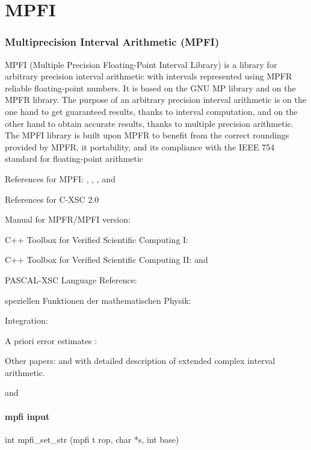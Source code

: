 \chapter{MPFI}



\subsection{Multiprecision Interval Arithmetic (MPFI)}
MPFI (Multiple Precision Floating-Point Interval Library) is a library for arbitrary precision interval arithmetic with intervals represented using MPFR reliable floating-point numbers. It is based on the GNU MP library and on the MPFR library. The purpose of an arbitrary precision interval arithmetic is on the one hand to get guaranteed results, thanks to interval computation, and on the other hand to obtain accurate results, thanks to multiple precision arithmetic. The MPFI library is built upon MPFR to benefit from the correct roundings provided by MPFR, it portability, and its compliance with the IEEE 754 standard for floating-point arithmetic

References for MPFI: \cite{MPFI_2005}, \cite{Moore_2009},  \cite{Hayer2003},  and \cite{INTLAB_1999}

References for C-XSC 2.0  \cite{Hofschuster2004}

Manual for MPFR/MPFI version: \cite{Blomquist2012}


C++ Toolbox for Verified Scientific Computing I:   \cite{Hammer1995}

C++ Toolbox for Verified Scientific Computing II:   \cite{Kramer1994} and \cite{Kramer2006}

PASCAL-XSC Language Reference: \cite{Klatte1991}

speziellen Funktionen der mathematischen Physik: \cite{Hofschuster2000}

Integration: \cite{Wedner2000}


A priori error estimates : \cite{Blomquist2005}

Other papers:    \cite{Blomquist2008a} and  \cite{Blomquist2008} with detailed description of extended complex interval arithmetic.

and   \cite{Kramer2012}





\subsubsection{mpfi input}
int mpfi\_set\_str (mpfi t rop, char *s, int base)

